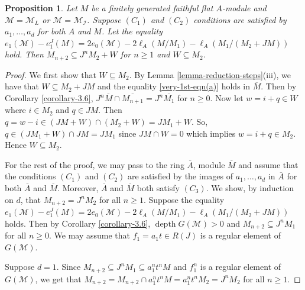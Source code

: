 \documentclass[11pt,reqno]{amsart}
\newtheorem{proposition}[theorem]{Proposition}
\theoremstyle{definition}
\def\M{{\mathcal M}}
\def\I{{\mathcal I}}
\DeclareMathOperator{\depth}{depth}
\numberwithin{equation}{section}
\begin{document}
\begin{proposition}\label{theorem-4.3}
 Let $M$ be a finitely generated faithful flat $A$-module and $\M=\M_L$ or $\M=\M_\I$. Suppose $(C_1)$ and $(C_2)$ conditions are satisfied by $a_1,\ldots,a_d$ for both $A$ and $M$.  Let the equality
	$e_1(\M)-e_1^J(M)=2e_0(\M)-2\ell_A(M/M_1)-\ell_A(M_1/(M_2+JM))$ hold. Then $M_{n+2}\subseteq J^nM_2+W$ for $n\geq 1$ and $W\subseteq M_2$.
\end{proposition}
\begin{proof}
 We first show that $W\subseteq M_2$.  By Lemma \ref{lemma-reduction-steps}(iii), we have that $W\subseteq M_2+JM$ and the equality \eqref{very-1st-eqn(a)} holds in $\overline{M}$. Then by Corollary \ref{corollary-3.6}, $J^n\overline{M}\cap \overline{M_{n+1}}=J^n\overline{M_1}$ for $n\geq 0$. 
 Now let $w=i+q\in W$ where $i\in M_2$ and $q\in JM$. Then $q=w-i\in (JM+W)\cap (M_2+W)=JM_1+W$.
	So, $q\in (JM_1+W)\cap JM=JM_1$ since $JM\cap W=0$ which implies $w=i+q\in M_2$. Hence $W\subseteq M_2$.
	
	For the rest of the proof, we may pass to the ring $\overline{A}$, module $\overline{M}$ and assume that the conditions $(C_1)$ and $(C_2)$ are satisfied by the images of $a_1,\ldots,a_d$ in $\overline{A}$ for both $\overline{A}$ and $\overline{M}.$ Moreover,  $\overline{A}$ and $\overline{M}$ both satisfy $(C_3)$. 
	We show, by induction on $d$, that $M_{n+2}= J^n M_2$ for all $n\geq 1$. Suppose the equality  $e_1(\M)-e_1^J(M)=2e_0(\M)-2\ell_A(M/M_1)-\ell_A(M_1/(M_2+JM))$
	holds. Then
	by Corollary \ref{corollary-3.6}, $\depth G(\M)>0$ and $M_{n+2}\subseteq J^n M_1$ for all $n\geq 0.$
	We may assume that 
	$f_1=a_1t\in R(J)$ is a regular element of $G(\M)$.
	
	Suppose $d=1$. Since $M_{n+2}\subseteq J^n M_1\subseteq a_1^nt^nM$ and $f_1^n$ is a regular element of $G(\M)$,  we get that $M_{n+2}=M_{n+2}\cap a_1^nt^nM=a_1^nt^nM_2= J^nM_2$ for all $n\geq 1$.
	

\end{proof}
\end{document}
